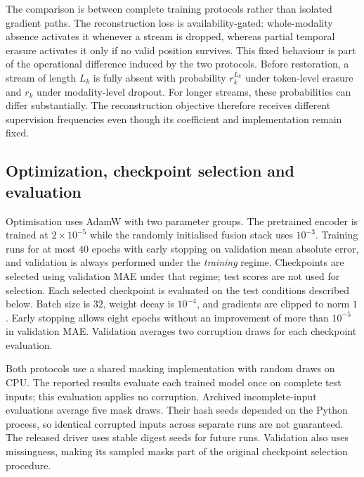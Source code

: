 \documentclass[preprint,11pt]{elsarticle}
\begin{document}
The comparison is between complete training protocols rather than isolated
gradient paths. The reconstruction loss is availability-gated: whole-modality
absence activates it whenever a stream is dropped, whereas partial temporal
erasure activates it only if no valid position survives. This fixed behaviour
is part of the operational difference induced by the two protocols.
Before restoration, a stream of length $L_k$ is fully absent with probability
$r_k^{L_k}$ under token-level erasure and $r_k$ under modality-level dropout.
For longer streams, these probabilities can differ substantially. The
reconstruction objective therefore receives different supervision frequencies
even though its coefficient and implementation remain fixed.

\subsection{Optimization, checkpoint selection and evaluation}

Optimisation uses AdamW with two parameter groups. The pretrained encoder is trained at
$2\times10^{-5}$ while the randomly initialised fusion stack uses
$10^{-3}$.
Training runs for at most $40$ epochs with early stopping on validation mean
absolute error, and validation is always performed under the \emph{training}
regime. Checkpoints are selected using validation MAE under that regime;
test scores are not used for selection. Each selected checkpoint is evaluated
on the test conditions described below. Batch size is $32$, weight decay is $10^{-4}$, and
gradients are clipped to norm $1$. Early stopping allows eight epochs without
an improvement of more than $10^{-5}$ in validation MAE. Validation averages
two corruption draws for each checkpoint evaluation.

Both protocols use a shared masking implementation with random draws on CPU.
The reported results evaluate each trained model once on complete test inputs;
this evaluation applies no corruption. Archived incomplete-input evaluations
average five mask draws. Their hash seeds depended on the Python process, so
identical corrupted inputs across separate runs are not guaranteed. The
released driver uses stable digest seeds for future runs. Validation also
uses missingness, making its sampled masks part of the original checkpoint
selection procedure.
\end{document}
